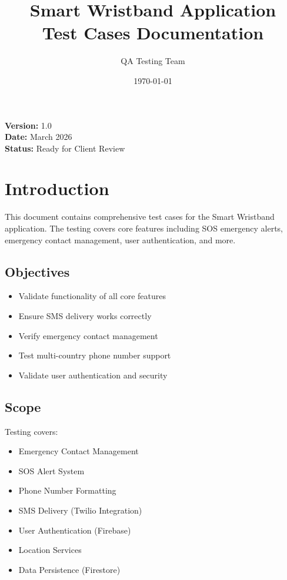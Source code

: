 \documentclass[12pt,a4paper]{article}
\title{\Large \textbf{Smart Wristband Application} \\ \large Test Cases Documentation}
\author{QA Testing Team}
\date{\today}
\begin{document}
\maketitle

\begin{center}
    \textbf{Version:} 1.0 \\
    \textbf{Date:} March 2026 \\
    \textbf{Status:} Ready for Client Review
\end{center}

\newpage
\tableofcontents
\newpage

\section{Introduction}

This document contains comprehensive test cases for the Smart Wristband application. The testing covers core features including SOS emergency alerts, emergency contact management, user authentication, and more.

\subsection{Objectives}
\begin{itemize}
    \item Validate functionality of all core features
    \item Ensure SMS delivery works correctly
    \item Verify emergency contact management
    \item Test multi-country phone number support
    \item Validate user authentication and security
\end{itemize}

\subsection{Scope}
Testing covers:
\begin{itemize}
    \item Emergency Contact Management
    \item SOS Alert System
    \item Phone Number Formatting
    \item SMS Delivery (Twilio Integration)
    \item User Authentication (Firebase)
    \item Location Services
    \item Data Persistence (Firestore)
\end{itemize}
\end{document}
